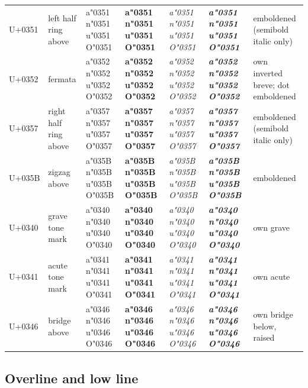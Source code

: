 \documentclass[landscape]{article}
\begin{document}
\begin{tabular}{@{}l>{\footnotesize}p{38mm}>{\Large}l>{\Large\bfseries}l>{\Large\itshape}l>{\Large\bfseries\itshape}l>{\footnotesize}p{38mm}@{}}
	{\footnotesize U+0351} & left half ring above & a\char"0351 n\char"0351 u\char"0351 O\char"0351 & a\char"0351 n\char"0351 u\char"0351 O\char"0351 & a\char"0351 n\char"0351 u\char"0351 O\char"0351 & a\char"0351 n\char"0351 u\char"0351 O\char"0351 & emboldened (semibold italic only) \\
	{\footnotesize U+0352} & fermata & a\char"0352 n\char"0352 u\char"0352 O\char"0352 & a\char"0352 n\char"0352 u\char"0352 O\char"0352 & a\char"0352 n\char"0352 u\char"0352 O\char"0352 & a\char"0352 n\char"0352 u\char"0352 O\char"0352 & own inverted breve; dot emboldened \\
	{\footnotesize U+0357} & right half ring above & a\char"0357 n\char"0357 u\char"0357 O\char"0357 & a\char"0357 n\char"0357 u\char"0357 O\char"0357 & a\char"0357 n\char"0357 u\char"0357 O\char"0357 & a\char"0357 n\char"0357 u\char"0357 O\char"0357 & emboldened (semibold italic only) \\
	{\footnotesize U+035B} & zigzag above & a\char"035B n\char"035B u\char"035B O\char"035B & a\char"035B n\char"035B u\char"035B O\char"035B & a\char"035B n\char"035B u\char"035B O\char"035B & a\char"035B n\char"035B u\char"035B O\char"035B & emboldened \\
	\hline
	{\footnotesize U+0340} & grave tone mark & a\char"0340 n\char"0340 u\char"0340 O\char"0340 & a\char"0340 n\char"0340 u\char"0340 O\char"0340 & a\char"0340 n\char"0340 u\char"0340 O\char"0340 & a\char"0340 n\char"0340 u\char"0340 O\char"0340 & own grave \\
	{\footnotesize U+0341} & acute tone mark & a\char"0341 n\char"0341 u\char"0341 O\char"0341 & a\char"0341 n\char"0341 u\char"0341 O\char"0341 & a\char"0341 n\char"0341 u\char"0341 O\char"0341 & a\char"0341 n\char"0341 u\char"0341 O\char"0341 & own acute \\
	{\footnotesize U+0346} & bridge above & a\char"0346 n\char"0346 u\char"0346 O\char"0346 & a\char"0346 n\char"0346 u\char"0346 O\char"0346 & a\char"0346 n\char"0346 u\char"0346 O\char"0346 & a\char"0346 n\char"0346 u\char"0346 O\char"0346 & own bridge below, raised \\
\end{tabular}
\endgroup


\newpage
\subsection*{Overline and low line}
\end{document}
